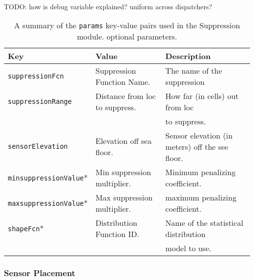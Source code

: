 TODO: how is debug variable explained?  uniform across dispatchers?

\begin{table}[ht]
	\begin{tabular}{l l l}
		Key									&	Value 							&	Description\\
		\hline
		\texttt{suppressionFcn}				& 	Suppression Function Name.		&	The name of the suppression \\

		\texttt{suppressionRange}			&	Distance from loc to suppress.	&	How far (in cells) out from loc\\
											&									&   to suppress.\\
		\texttt{sensorElevation}			& 	Elevation off sea floor.		&   Sensor elevation (in meters) off the see floor.\\
		\texttt{minsuppressionValue}*		& 	Min suppression multiplier.		&	Minimum penalizing coefficient.\\
		\texttt{maxsuppressionValue}*		& 	Max suppression multiplier.		&	maximum penalizing coefficient.\\
		\texttt{shapeFcn}*					&   Distribution Function ID. 		&   Name of the statistical distribution\\
											&									&   model to use.\\
	\end{tabular}
	\caption{A summary of the \texttt{params} key-value pairs used in the Suppression module.  \newline * optional parameters.
		\label{animalParams}}
\end{table}

\subsubsection{Sensor Placement}



